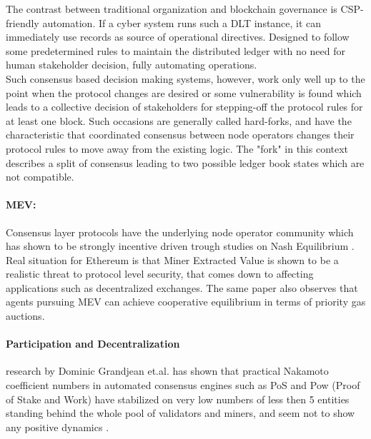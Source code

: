 \documentclass{article}
\begin{document}
\begin{CJK}{UTF8}{gbsn}
\begin{multicols}{2}
        The contrast between traditional organization and blockchain governance is CSP-friendly automation. If a cyber system runs such a DLT instance, it can immediately use records as source of operational directives. Designed to follow some predetermined rules to maintain the distributed ledger with no need for human stakeholder decision, fully automating operations.\\
        Such consensus based decision making systems, however, work only well up to the point when the protocol changes are desired or some vulnerability is found which leads to a collective decision of stakeholders for stepping-off the protocol rules for at least one block\cite{Liu2021}. Such occasions are generally called hard-forks, and have the characteristic that coordinated consensus between node operators changes their protocol rules to move away from the existing logic. The "fork" in this context describes a split of consensus leading to two possible ledger book states which are not compatible. \\
        \paragraph{MEV:} Consensus layer protocols have the underlying node operator community which has shown to be strongly incentive driven trough studies on Nash Equilibrium \cite{Nida2020}. Real situation for Ethereum is that Miner Extracted Value is shown to be a realistic threat to protocol level security, that comes down to affecting applications such as decentralized exchanges\cite{Philip2019}. The same paper also observes that agents pursuing MEV can achieve cooperative equilibrium in terms of priority gas auctions.
        \paragraph{Participation and Decentralization} research by Dominic Grandjean et.al. has shown that practical Nakamoto coefficient numbers in automated consensus engines such as PoS and Pow (Proof of Stake and Work) have stabilized on very low numbers of less then 5 entities standing behind the whole pool of validators and miners, and seem not to show any positive dynamics \cite{Dominic2023}.


\end{multicols}
\end{CJK}
\end{document}

